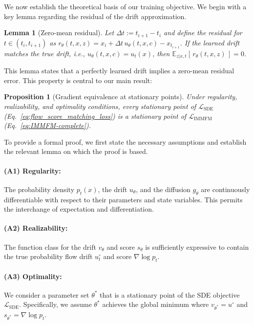 \documentclass[twoside]{article}
\newtheorem{proposition}{Proposition}[section]
\newtheorem{lemma}{Lemma}[section]
\begin{document}
{\color{black}
We now establish the theoretical basis of our training objective. We begin with a key lemma regarding the residual of the drift approximation.

\begin{lemma}[Zero-mean residual]
\label{thm:lemma_zero_mean}
Let $\Delta t := t_{i+1}-t_i$ and define the residual for $t\in(t_i,t_{i+1})$ as $r_\theta(t,x,z) = x_i + \Delta t\,u_\theta(t,x,c) - x_{t_{i+1}}$. If the learned drift matches the true drift, i.e., $u_\theta(t,x,c)=u_t(x)$, then $\mathbb{E}_{z|x,t}[\,r_\theta(t,x,z)\,]=0$.
\end{lemma}

This lemma states that a perfectly learned drift implies a zero-mean residual error. This property is central to our main result:

\begin{proposition}[Gradient equivalence at stationary points]
\label{thm:grad-eq}
Under regularity, realizability, and optimality conditions, every stationary point of $\mathcal L_{\mathrm{SDE}}$ (Eq.~\ref{eq:flow_score_matching_loss}) is a stationary point of $\mathcal L_{\mathrm{IMMFM}}$ (Eq.~\ref{eq:IMMFM-complete}).
\end{proposition}

{\color{black}

To provide a formal proof, we first state the necessary assumptions and establish the relevant lemma on which the proof is based.

\paragraph{(A1) Regularity:} The probability density $p_t(x)$, the drift $u_\theta$, and the diffusion $g_\theta$ are continuously differentiable with respect to their parameters and state variables. This permits the interchange of expectation and differentiation.
\paragraph{(A2) Realizability:}  The function class for the drift $v_\theta$ and score $s_\theta$ is sufficiently expressive to contain the true probability flow drift $u^\circ_t$ and score $\nabla \log p_t$.
\paragraph{(A3) Optimality:} We consider a parameter set $\theta^*$ that is a stationary point of the SDE objective $\mathcal{L}_{\text{SDE}}$. Specifically, we assume $\theta^*$ achieves the global minimum where $v_{\theta^*} = u^\circ$ and $s_{\theta^*} = \nabla \log p_t$.

}}
\end{document}
